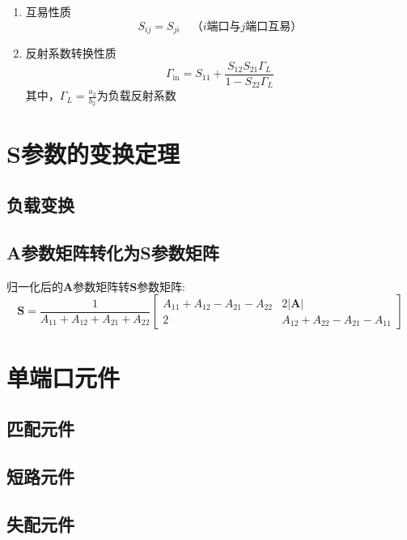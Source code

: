 \begin{enumerate}
\begin{subequations}
\begin{numcases}{\mbox{}}
                    |S_{12}|=|S_{21}| \\
                    (\varphi_{12}+\varphi_{21})-(\varphi_{11}+\varphi_{22})=\pm\pi
                \end{numcases}
            \end{subequations}
            \item 互易性质
            \begin{equation}
                S_{ij}=S_{ji}\quad\mbox{（$i$端口与$j$端口互易）}
            \end{equation}
            \item 反射系数转换性质
            \begin{equation}
                \varGamma_\mathrm{in}=S_{11}+\frac{S_{12}S_{21}\varGamma_L}{1-S_{22}\varGamma_L}
            \end{equation}
            其中，$\varGamma_L=\frac{a_2}{b_2}$为负载反射系数
        \end{enumerate}


\section{S参数的变换定理}
    \subsection{负载变换}
    \subsection{A参数矩阵转化为S参数矩阵}
    
    归一化后的$\bm{A}$参数矩阵转$\bm{S}$参数矩阵:
    \begin{equation}
        \bm{S}=\frac{1}{A_{11}+A_{12}+A_{21}+A_{22}}
        \begin{bmatrix}
            A_{11}+A_{12}-A_{21}-A_{22}&2|\bm{A}|\\
            2&A_{12}+A_{22}-A_{21}-A_{11}
        \end{bmatrix}
    \end{equation}

\section{单端口元件}
    \subsection{匹配元件}
    \subsection{短路元件}
    \subsection{失配元件}

